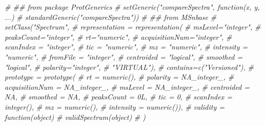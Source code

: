 \documentclass[
]{article}
\newenvironment{Shaded}{\begin{snugshade}}{\end{snugshade}}
\newcommand{\CommentTok}[1]{\textcolor[rgb]{0.56,0.35,0.01}{\textit{#1}}}
\begin{document}
\begin{Shaded}
\begin{Highlighting}[]
\CommentTok{\# \#\# from package ProtGenerics}
\CommentTok{\# setGeneric("compareSpectra", function(x, y, ...)}
\CommentTok{\#     standardGeneric("compareSpectra"))}
\CommentTok{\# \#\# from MSnbase}
\CommentTok{\# setClass("Spectrum",}
\CommentTok{\#          representation = representation(}
\CommentTok{\#              msLevel="integer",}
\CommentTok{\#              peaksCount="integer",}
\CommentTok{\#              rt="numeric",}
\CommentTok{\#              acquisitionNum="integer",}
\CommentTok{\#              scanIndex = "integer",}
\CommentTok{\#              tic = "numeric",}
\CommentTok{\#              mz = "numeric",}
\CommentTok{\#              intensity = "numeric",}
\CommentTok{\#              fromFile = "integer",}
\CommentTok{\#              centroided = "logical",}
\CommentTok{\#              smoothed = "logical",}
\CommentTok{\#              polarity="integer",}
\CommentTok{\#              "VIRTUAL"),}
\CommentTok{\#          contains=c("Versioned"),}
\CommentTok{\#          prototype = prototype(}
\CommentTok{\#              rt = numeric(),}
\CommentTok{\#              polarity = NA\_integer\_,}
\CommentTok{\#              acquisitionNum = NA\_integer\_,}
\CommentTok{\#              msLevel = NA\_integer\_,}
\CommentTok{\#              centroided = NA,}
\CommentTok{\#              smoothed = NA,}
\CommentTok{\#              peaksCount = 0L,}
\CommentTok{\#              tic = 0,}
\CommentTok{\#              scanIndex = integer(),}
\CommentTok{\#              mz = numeric(),}
\CommentTok{\#              intensity = numeric()),}
\CommentTok{\#          validity = function(object)}
\CommentTok{\#              validSpectrum(object)}
\CommentTok{\#          )}


\end{Highlighting}
\end{Shaded}
\end{document}
